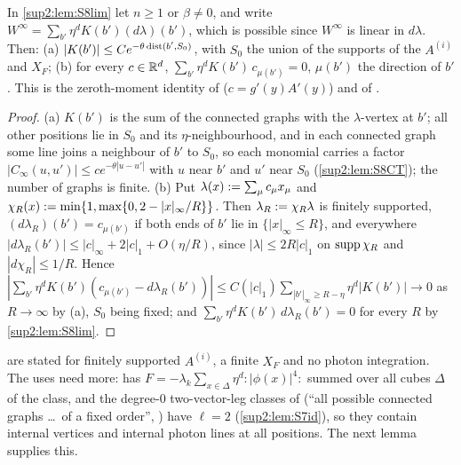 
\begin{lemma}\label{sup2:lem:S8zero}
In \cref{sup2:lem:S8lim} let $n\ge1$ or $\beta\ne0$, and write $W^\infty=\sum_{b'}\eta^dK(b')(d\lambda)(b')$, which is possible since $W^\infty$ is linear in $d\lambda$. Then: \textup{(a)} $|K(b')|\le Ce^{-\theta\operatorname{dist}(b',S_0)}$, with $S_0$ the union of the supports of the $A^{(i)}$ and $X_F$; \textup{(b)} for every $c\in\mathbb R^d$, $\sum_{b'}\eta^dK(b')\,c_{\mu(b')}=0$, $\mu(b')$ the direction of $b'$. This is the zeroth-moment identity of \cite[(3.29)]{Ba3} ($c=g'(y)A'(y)$) and of \cite[(3.31)--(3.32)]{Ba3}.
\end{lemma}

\begin{proof}
(a) $K(b')$ is the sum of the connected graphs with the $\lambda$-vertex at $b'$; all other positions lie in $S_0$ and its $\eta$-neighbourhood, and in each connected graph some line joins a neighbour of $b'$ to $S_0$, so each monomial carries a factor $|C_\infty(u,u')|\le ce^{-\theta|u-u'|}$ with $u$ near $b'$ and $u'$ near $S_0$ (\cref{sup2:lem:S8CT}); the number of graphs is finite. (b) Put $\lambda(x):=\sum_\mu c_\mu x_\mu$ and $\chi_R(x):=\min\{1,\max\{0,2-|x|_\infty/R\}\}$. Then $\lambda_R:=\chi_R\lambda$ is finitely supported, $(d\lambda_R)(b')=c_{\mu(b')}$ if both ends of $b'$ lie in $\{|x|_\infty\le R\}$, and everywhere $|d\lambda_R(b')|\le|c|_\infty+2|c|_1+O(\eta/R)$, since $|\lambda|\le2R|c|_1$ on $\operatorname{supp}\chi_R$ and $|d\chi_R|\le1/R$. Hence $|\sum_{b'}\eta^dK(b')(c_{\mu(b')}-d\lambda_R(b'))|\le C(|c|_1)\sum_{|b'|_\infty\ge R-\eta}\eta^d|K(b')|\to0$ as $R\to\infty$ by (a), $S_0$ being fixed; and $\sum_{b'}\eta^dK(b')\,d\lambda_R(b')=0$ for every $R$ by \cref{sup2:lem:S8lim}.
\end{proof}

 are stated for finitely supported $A^{(i)}$, a finite $X_F$ and no photon integration. The uses need more: \cite[(2.28)]{Ba3} has $F=-\lambda_k\sum_{x\in\Delta}\eta^d:\!|\phi(x)|^4\!:$ summed over all cubes $\Delta$ of the class, and the degree-$0$ two-vector-leg classes of \cite[(3.31)--(3.32)]{Ba3} (``all possible connected graphs \dots\ of a fixed order'', \cite[p.~431]{Ba3}) have $\ell=2$ (\cref{sup2:lem:S7id}), so they contain internal vertices and internal photon lines at all positions. The next lemma supplies this.

